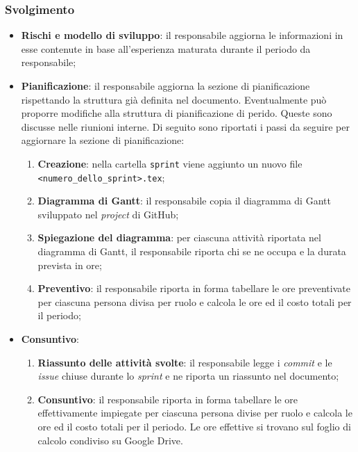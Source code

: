 \subsubsection*{Svolgimento}
\begin{itemize}
	\item \textbf{Rischi e modello di sviluppo}: il responsabile aggiorna
		le informazioni in esse contenute in base all'esperienza maturata
		durante il periodo da responsabile;

	\item \textbf{Pianificazione}: il responsabile aggiorna la sezione di
		pianificazione rispettando la struttura già definita nel documento.
		Eventualmente può proporre modifiche alla struttura di pianificazione
		di perido. Queste sono discusse nelle riunioni interne.
		Di seguito sono riportati i passi da seguire per aggiornare la sezione
		di pianificazione:
		\begin{enumerate}
			\item \textbf{Creazione}: nella cartella \texttt{sprint} viene
					aggiunto un nuovo file \\ \texttt{<numero\_dello\_sprint>.tex};

			\item \textbf{Diagramma di Gantt}: il responsabile copia il
					diagramma di Gantt sviluppato nel \textit{project} di
					GitHub\g;

			\item \textbf{Spiegazione del diagramma}: per ciascuna attività
					riportata nel diagramma di Gantt, il responsabile riporta
					chi se ne occupa e la durata prevista in ore;

			\item \textbf{Preventivo}: il responsabile riporta in forma
					tabellare le ore preventivate per ciascuna persona divisa
					per ruolo e calcola le ore ed il costo totali per il
					periodo;
		\end{enumerate}

	\item \textbf{Consuntivo}:
		\begin{enumerate}
			\item \textbf{Riassunto delle attività svolte}: il responsabile
					legge i \textit{commit} e le \textit{issue\g} chiuse durante
					lo \textit{sprint} e ne riporta un riassunto nel documento;

			\item \textbf{Consuntivo}: il responsabile riporta in forma
					tabellare le ore effettivamente impiegate per ciascuna
					persona divise per ruolo e calcola le ore ed il costo
					totali per il periodo. Le ore effettive si trovano sul foglio di calcolo condiviso su Google Drive.


\end{enumerate}
\end{itemize}
